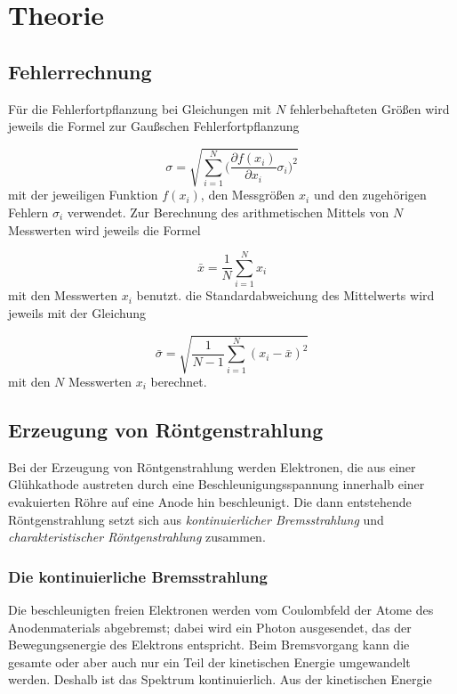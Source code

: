 \section{Theorie}
\label{sec:Theorie}

\subsection{Fehlerrechnung}

Für die Fehlerfortpflanzung bei Gleichungen mit $N$ fehlerbehafteten Größen
wird jeweils die Formel zur Gaußschen Fehlerfortpflanzung

\begin{equation}
  \sigma = \sqrt{\sum_{i=1}^{N}\biggl(\frac{\partial f(x_i)}{\partial x_i}
  \sigma_i\biggr)^2}
\end{equation}
mit der jeweiligen Funktion $f(x_i)$, den Messgrößen $x_i$ und den
zugehörigen Fehlern $\sigma_i$ verwendet.
Zur Berechnung des arithmetischen Mittels von $N$ Messwerten wird jeweils die
Formel

\begin{equation}
  \bar{x} = \frac{1}{N}\sum_{i=1}^{N}x_i
\end{equation}
mit den Messwerten $x_i$ benutzt.
die Standardabweichung des Mittelwerts wird jeweils mit der Gleichung

\begin{equation}
  \bar{\sigma} = \sqrt{\frac{1}{N-1}\sum_{i=1}^{N}(x_i - \bar{x})^2}
\end{equation}
mit den $N$ Messwerten $x_i$ berechnet.

\subsection{Erzeugung von Röntgenstrahlung}

Bei der Erzeugung von Röntgenstrahlung werden Elektronen, die aus einer Glühkathode
austreten durch eine Beschleunigungsspannung innerhalb einer evakuierten Röhre
auf eine Anode  hin beschleunigt. Die dann entstehende Röntgenstrahlung setzt sich
aus \emph{kontinuierlicher Bremsstrahlung} und \emph{charakteristischer Röntgenstrahlung}
zusammen.

\subsubsection{Die kontinuierliche Bremsstrahlung}

Die beschleunigten freien Elektronen werden vom Coulombfeld der Atome des Anodenmaterials
abgebremst; dabei wird ein Photon ausgesendet, das der Bewegungsenergie des  Elektrons
entspricht. Beim Bremsvorgang kann die gesamte oder aber auch nur ein Teil der
kinetischen Energie umgewandelt werden. Deshalb ist das Spektrum kontinuierlich.
Aus der kinetischen Energie

